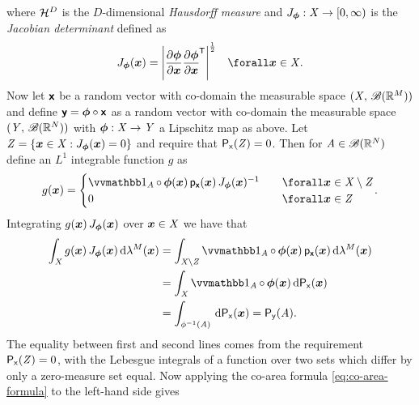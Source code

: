 where $\haum{D}$ is the $D$-dimensional \emph{Hausdorff measure}  and $J_{\boldsymbol{\phi}} : \mathit{X} \to [0,\infty)$ is the \emph{Jacobian determinant} defined as
\begin{equation}\label{eq:jacobian-determinant-def}
 J_{\vct{\phi}}(\vct{x}) = 
 \left|\pd{\vct{\phi}}{\vct{x}}\pd{\vct{\phi}}{\vct{x}}\tr\right|^{\frac{1}{2}}
 \quad \forall \vct{x} \in \set{X}.
\end{equation}
Now let $\boldsymbol{\mathsf{x}}$ be a random vector with co-domain the measurable space $(\mathit{X},\,\mathscr{B}(\mathbb{R}^M))$ and define $\boldsymbol{\mathsf{y}} = \boldsymbol{\phi} \circ \boldsymbol{\mathsf{x}}$ as a random vector with co-domain the measurable space $(\mathit{Y},\,\mathscr{B}(\mathbb{R}^N))$ with $\boldsymbol{\phi} : \mathit{X} \to \mathit{Y}$ a Lipschitz map as above. Let $\set{Z} = \lbr \vct{x} \in \set{X} : J_{\vct{\phi}}(\vct{x}) = 0 \rbr$ and require that $\mathsf{P}_{\mathsf{x}}(\mathit{Z}) = 0$. Then for $\mathit{A} \in \mathscr{B}(\mathbb{R}^N)$ define an $L^1$ integrable function $g$ as
\begin{equation}\label{eq:change-of-var-real-vector-derivation-1}
  g(\vct{x}) = 
  \begin{cases}
    \ind{\set{A}}\circ\,\vct{\phi}(\vct{x}) \, \pden{\rvct{x}}(\vct{x}) \, J_{\vct{\phi}}(\vct{x})^{-1}
    & \quad \forall \vct{x} \in \set{X} \setminus \set{Z}\\
    0 & \quad \forall \vct{x} \in \set{Z}
  \end{cases}.
\end{equation}
Integrating $g(\boldsymbol{x})\,J_{\boldsymbol{\phi}}(\boldsymbol{x})$ over $\boldsymbol{x} \in \mathit{X}$ we have that
\begin{align}\label{eq:change-of-var-real-vector-derivation-2}
  \int_{\set{X}} 
    g(\vct{x}) \, J_{\vct{\phi}}(\vct{x})
  \,\dr\lambda^{M}(\vct{x}) 
  &=
  \int_{\set{X}\setminus{\set{Z}}}
    \ind{\set{A}}\circ\,\vct{\phi}(\vct{x})\,
    \pden{\rvct{x}}(\vct{x})
  \,\dr\lambda^{M}(\vct{x})\\
  &=
  \int_{\set{X}}
    \ind{\set{A}}\circ\,\vct{\phi}(\vct{x})
  \,\dr\prob{\rvar{x}}(\vct{x})
  \\
  &=
  \int_{\phi^{-1}(\set{A})}
  \,\dr\prob{\rvar{x}}(\vct{x}) = \prob{\rvar{y}}(\set{A}).
\end{align}
The equality between first and second lines comes from the requirement $\mathsf{P}_{\mathsf{x}}(\mathit{Z}) = 0$, with the Lebesgue integrals of a function over two sets which differ by only a zero-measure set equal. Now applying the co-area formula \eqref{eq:co-area-formula} to the left-hand side gives
